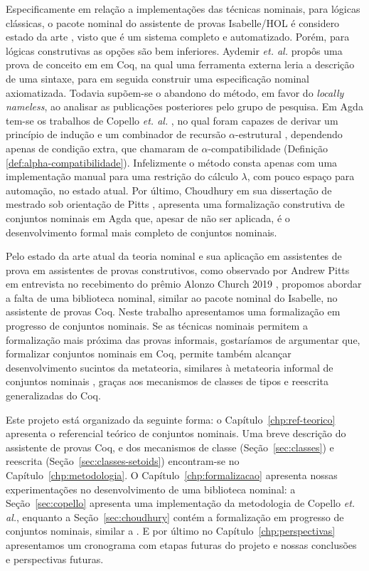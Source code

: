 Especificamente em relação a implementações das técnicas nominais, para lógicas clássicas, o pacote nominal \cite{IsabelleNominal, Urban2008} do assistente de provas Isabelle/HOL \cite{Nipkow2002} é considero estado da arte \cite{Pitts2016}, visto que é um sistema completo e automatizado. Porém, para lógicas construtivas as opções são bem inferiores. Aydemir \textit{et. al.} propôs uma prova de conceito em \cite{Aydemir2007} em Coq, na qual uma ferramenta externa leria a descrição de uma sintaxe, para em seguida construir uma especificação nominal axiomatizada. Todavia supõem-se o abandono do método, em favor do \textit{locally nameless}, ao analisar as publicações posteriores pelo grupo de pesquisa. Em Agda tem-se os trabalhos de Copello \textit{et. al.} \cite{Copello2016,Copello2018} , no qual foram capazes de derivar um princípio de indução e um combinador de recursão $\alpha$-estrutural \cite{Pitts2006}, dependendo apenas de condição extra, que chamaram de $\alpha$-compatibilidade (Definição \ref{def:alpha-compatibilidade}). Infelizmente o método consta apenas com uma implementação manual para uma restrição do cálculo $\lambda$, com pouco espaço para automação, no estado atual. Por último, Choudhury em sua dissertação de mestrado sob orientação de Pitts \cite{Choudhury2015}, apresenta uma formalização construtiva de conjuntos nominais em Agda que, apesar de não ser aplicada, é o desenvolvimento formal mais completo de conjuntos nominais.

Pelo estado da arte atual da teoria nominal e sua aplicação em assistentes de prova
em assistentes de provas construtivos, como observado por Andrew Pitts em entrevista no recebimento do prêmio Alonzo Church 2019 \cite{Aceto2019}, propomos abordar a falta de uma biblioteca nominal, similar ao pacote nominal do Isabelle, no assistente de provas Coq. Neste trabalho apresentamos uma formalização em progresso de conjuntos nominais. Se as técnicas nominais permitem a formalização mais próxima das provas informais, gostaríamos de argumentar que, formalizar conjuntos nominais em Coq, permite também alcançar desenvolvimento sucintos da metateoria, similares à metateoria informal de conjuntos nominais \cite{Pitts2013}, graças aos mecanismos de classes de tipos e reescrita generalizadas do Coq.

Este projeto está organizado da seguinte forma: o Capítulo~\ref{chp:ref-teorico} apresenta o referencial teórico de conjuntos nominais. Uma breve descrição do assistente de provas Coq, e dos mecanismos de classe (Seção~\ref{sec:classes}) e reescrita (Seção~\ref{sec:classes-setoids}) encontram-se no Capítulo~\ref{chp:metodologia}. O Capítulo~\ref{chp:formalizacao} apresenta nossas experimentações no desenvolvimento de uma biblioteca nominal: a Seção~\ref{sec:copello}
apresenta uma implementação da metodologia de Copello \textit{et. al.}, enquanto a Seção~\ref{sec:choudhury} contém a formalização em progresso de conjuntos nominais, similar a \cite{Choudhury2015}. E por último no Capítulo~\ref{chp:perspectivas}  apresentamos um cronograma com etapas futuras do projeto e nossas conclusões e perspectivas futuras. 